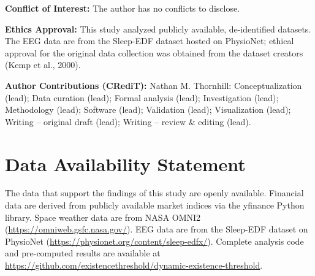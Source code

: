 \documentclass[aip,cha,reprint,amsmath,amssymb,final,floatfix]{revtex4-2}
\begin{document}
\noindent\textbf{Conflict of Interest:} The author has no conflicts to disclose.
\medskip

\noindent\textbf{Ethics Approval:} This study analyzed publicly available, de-identified datasets. The EEG data are from the Sleep-EDF dataset hosted on PhysioNet; ethical approval for the original data collection was obtained from the dataset creators (Kemp et al., 2000).
\medskip

\noindent\textbf{Author Contributions (CRediT):} Nathan M. Thornhill: Conceptualization (lead); Data curation (lead); Formal analysis (lead); Investigation (lead); Methodology (lead); Software (lead); Validation (lead); Visualization (lead); Writing -- original draft (lead); Writing -- review \& editing (lead).

\section*{Data Availability Statement}

The data that support the findings of this study are openly available. Financial data are derived from publicly available market indices via the yfinance Python library. Space weather data are from NASA OMNI2 (\url{https://omniweb.gsfc.nasa.gov/}). EEG data are from the Sleep-EDF dataset on PhysioNet (\url{https://physionet.org/content/sleep-edfx/}). Complete analysis code and pre-computed results are available at \url{https://github.com/existencethreshold/dynamic-existence-threshold}.
\end{document}
